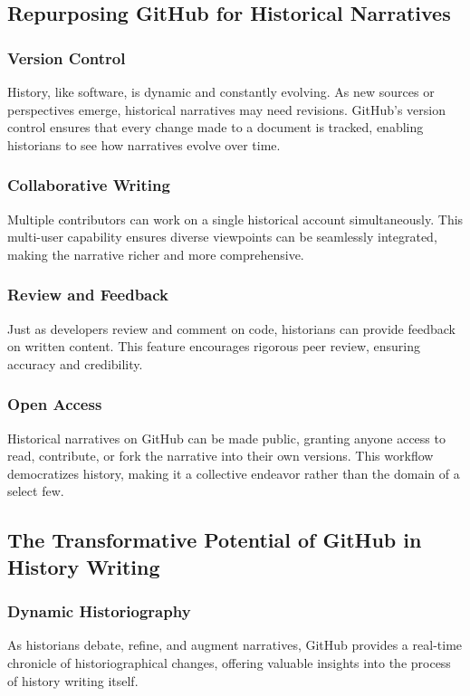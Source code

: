 \documentclass[a4paper,12pt]{book}
\begin{document}
\subsection*{Repurposing GitHub for Historical Narratives}
\subsubsection*{Version Control}
History, like software, is dynamic and constantly evolving. As new sources or perspectives emerge, historical narratives may need revisions. GitHub's version control ensures that every change made to a document is tracked, enabling historians to see how narratives evolve over time.

\subsubsection*{Collaborative Writing}
Multiple contributors can work on a single historical account simultaneously. This multi-user capability ensures diverse viewpoints can be seamlessly integrated, making the narrative richer and more comprehensive.

\subsubsection*{Review and Feedback}
Just as developers review and comment on code, historians can provide feedback on written content. This feature encourages rigorous peer review, ensuring accuracy and credibility.

\subsubsection*{Open Access}
Historical narratives on GitHub can be made public, granting anyone access to read, contribute, or fork the narrative into their own versions. This workflow democratizes history, making it a collective endeavor rather than the domain of a select few.

\subsection*{The Transformative Potential of GitHub in History Writing}
\subsubsection*{Dynamic Historiography}
As historians debate, refine, and augment narratives, GitHub provides a real-time chronicle of historiographical changes, offering valuable insights into the process of history writing itself.
\end{document}
